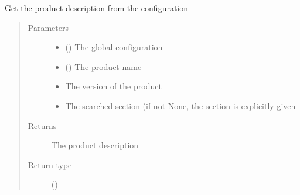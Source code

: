 \documentclass[a4paper,10pt,english]{sphinxmanual}
\begin{document}
\begin{fulllineitems}
\label{\detokenize{commands/apidoc/src:src.product.get_product_section}}
Get the product description from the configuration
\begin{quote}\begin{description}
\item[{Parameters}] \leavevmode\begin{itemize}
\item {} 
 () \textendash{} The global configuration

\item {} 
 () \textendash{} The product name

\item {} 
 \textendash{} The version of the product

\item {} 
 \textendash{} The searched section (if not None, the section is 
explicitly given

\end{itemize}

\item[{Returns}] \leavevmode
The product description

\item[{Return type}] \leavevmode
{\hyperref[\detokenize{commands/apidoc/src:src.pyconf.Config}]{}} ()

\end{description}\end{quote}

\end{fulllineitems}

\end{document}
